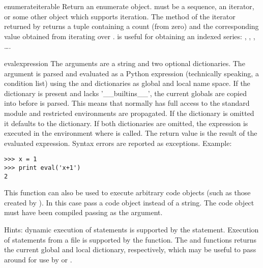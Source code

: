 \begin{funcdesc}{enumerate}{iterable}
  Return an enumerate object.  must be a sequence, an
  iterator, or some other object which supports iteration.  The
   method of the iterator returned by
   returns a tuple containing a count (from
  zero) and the corresponding value obtained from iterating over
  .   is useful for obtaining an
  indexed series: , , , \ldots.
\end{funcdesc}

\begin{funcdesc}{eval}{expression}
  The arguments are a string and two optional dictionaries.  The
   argument is parsed and evaluated as a Python
  expression (technically speaking, a condition list) using the
   and  dictionaries as global and local name
  space.  If the  dictionary is present and lacks
  '__builtins__', the current globals are copied into  before
   is parsed.  This means that 
  normally has full access to the standard
   module and restricted environments
  are propagated.  If the  dictionary is omitted it defaults to
  the  dictionary.  If both dictionaries are omitted, the
  expression is executed in the environment where  is
  called.  The return value is the result of the evaluated expression.
  Syntax errors are reported as exceptions.  Example:

\begin{verbatim}
>>> x = 1
>>> print eval('x+1')
2
\end{verbatim}

  This function can also be used to execute arbitrary code objects
  (such as those created by ).  In this case pass
  a code object instead of a string.  The code object must have been
  compiled passing  as the  argument.

  Hints: dynamic execution of statements is supported by the
   statement.  Execution of statements from a file is
  supported by the  function.  The
   and  functions returns the
  current global and local dictionary, respectively, which may be
  useful to pass around for use by  or
  .
\end{funcdesc}

